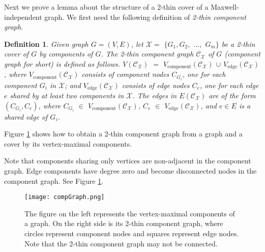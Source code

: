 \documentclass[10pt]{article}
\def\X{\mathcal {X}}
\def\C{\mathscr{C}}
\newtheorem{dfn}{Definition}
\begin{document}
\medskip\noindent
Next we prove a lemma about the structure of a 2-thin cover of a Maxwell-independent graph.
We first need the following definition of {\em 2-thin component graph}.


\begin{dfn}\label{dfn:componentGraph}
Given graph $G=(V, E)$, let $\X=$ $\{G_1, G_2,$ $ \ldots,$ $ G_m\}$ be a 2-thin cover of $G$ by components of $G$. The {\em 2-thin component graph} $\C_{\X}$ of $G$ ({\em component graph} for short) is defined as follows. $V(\C_{\X}) $ $=$ $V_\text{component}(\C_{\X})$ $\cup $ $V_\text{edge}(\C_{\X})$, where $V_\text{component}(\C_{\X})$ consists of {\em component nodes} $C_{G_i}$, one for each component $G_i$ in $\X$; and $V_\text{edge}(\C_{\X})$ consists of {\em edge nodes} $C_e$, one for each edge $e$ shared by at least two components in $\X$. The edges in $E(\C_{\X})$ are of the form $(C_{G_i}, C_e)$, where $C_{G_i}$ $\in$ $V_\text{component}(\C_{\X})$, $C_e$ $\in$ $V_\text{edge}(\C_{\X})$, and $e\in E$ is a shared edge of $G_i$.
\end{dfn}
\noindent
Figure \ref{compG} shows how to obtain a 2-thin component graph from a graph and a cover by its vertex-maximal components.

\medskip
\noindent
Note that components sharing only vertices are non-adjacent in the component graph. Edge components have degree zero and become disconnected nodes in the component graph. See Figure \ref{compG}.

\begin{center}
\begin{figure}[!h]
\begin{center}
\texttt{[image: compGraph.png]}
\end{center}
\caption{The figure on the left represents the vertex-maximal components of a graph. On the right side is its 2-thin component graph, where circles represent component nodes and squares represent edge nodes. Note that the 2-thin component graph may not be connected.}\label{compG}
\end{figure}
\end{center}

\begin{comment}
\begin{center}
\begin{figure}[h]
\begin{center}
\psfrag{Con}{Two components share an edge}\psfrag{Dis}{Two components do not share an edge}
\scalebox{0.5}[0.5]{\texttt{[image: compGraph]}}
\end{center}
\caption{The figure on the left represents the vertex-maximal components of a graph. On the right side is its 2-thin component graph, where circles represent component nodes and squares represent edge nodes. Note that the 2-thin component graph may not be connected.}\label{compG}
\end{figure}
\end{center}
\end{comment}
\end{document}
